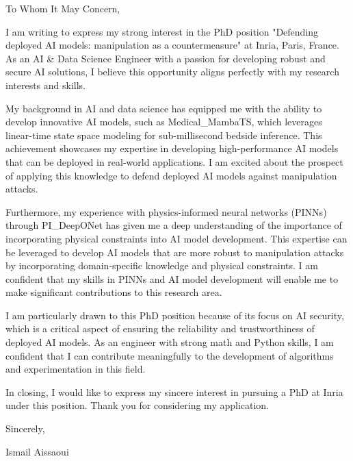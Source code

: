 \documentclass{letter}
\begin{document}
\opening{\noindent To Whom It May Concern,}

I am writing to express my strong interest in the PhD position "Defending deployed AI models: manipulation as a countermeasure" at Inria, Paris, France. As an AI & Data Science Engineer with a passion for developing robust and secure AI solutions, I believe this opportunity aligns perfectly with my research interests and skills.

My background in AI and data science has equipped me with the ability to develop innovative AI models, such as Medical_MambaTS, which leverages linear-time state space modeling for sub-millisecond bedside inference. This achievement showcases my expertise in developing high-performance AI models that can be deployed in real-world applications. I am excited about the prospect of applying this knowledge to defend deployed AI models against manipulation attacks.

Furthermore, my experience with physics-informed neural networks (PINNs) through PI_DeepONet has given me a deep understanding of the importance of incorporating physical constraints into AI model development. This expertise can be leveraged to develop AI models that are more robust to manipulation attacks by incorporating domain-specific knowledge and physical constraints. I am confident that my skills in PINNs and AI model development will enable me to make significant contributions to this research area.

I am particularly drawn to this PhD position because of its focus on AI security, which is a critical aspect of ensuring the reliability and trustworthiness of deployed AI models. As an engineer with strong math and Python skills, I am confident that I can contribute meaningfully to the development of algorithms and experimentation in this field.

In closing, I would like to express my sincere interest in pursuing a PhD at Inria under this position. Thank you for considering my application.

\closing{\noindent Sincerely,}

Ismail Aissaoui
\end{document}
